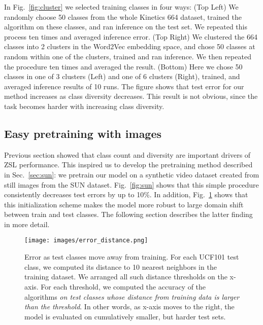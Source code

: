 \documentclass[10pt,twocolumn,letterpaper]{article}
\begin{document}
In Fig.~\ref{fig:cluster} we selected  training classes in four ways: (Top Left) We randomly choose 50 classes from the whole Kinetics 664 dataset, trained the algorithm on these classes, and ran inference on the test set. We repeated this process ten times and averaged inference error. (Top Right) We clustered the 664 classes into 2 clusters in the Word2Vec embedding space, and chose 50 classes at random within one of the clusters, trained and ran inference. We then repeated the procedure ten times and averaged the result. (Bottom) Here we chose 50 classes in one of 3 clusters (Left) and one of 6 clusters (Right), trained, and averaged inference results of 10 runs. The figure shows that test error for our method increases as class diversity decreases. This result is not obvious, since the task becomes harder with increasing class diversity.

\subsection{Easy pretraining with images}\label{sec:expsun}
Previous section showed that class count and diversity are important drivers of ZSL performance. This inspired us to develop the pretraining method described in Sec.~\ref{sec:sun}: we pretrain our model on a synthetic video dataset created from still images from the SUN dataset. Fig.~\ref{fig:sun} shows that  this simple procedure consistently decreases test errors by up to 10\%. In addition, Fig.~\ref{fig:error_distance} shows that this initialization scheme makes the model more robust to large domain shift between train and test classes. The following section describes the latter finding in more detail.

\begin{figure}
\centering
\texttt{[image: images/error\_distance.png]}
\caption{Error as test classes move away from training. For each UCF101 test class, we computed its distance to 10 nearest neighbors in the training dataset. We arranged all such distance thresholds on the x-axis. For each threshold, we computed the accuracy of the algorithms \emph{on test classes whose distance from training data is larger than the threshold}. In other words, as x-axis moves to the right,
the model is evaluated on cumulatively smaller, but harder test sets.}
\label{fig:error_distance}
\end{figure}
\end{document}
